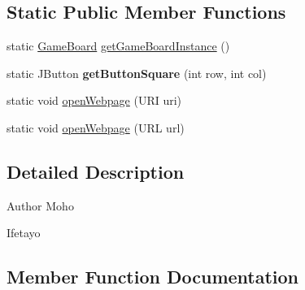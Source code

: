\subsection*{Static Public Member Functions}
\begin{DoxyCompactItemize}
\item 
static \hyperlink{classswantech_1_1_game_board}{Game\+Board} \hyperlink{classswantech_1_1_game_board_adf68d07f448466b7cea27014ba5f40b4}{get\+Game\+Board\+Instance} ()
\item 
\hypertarget{classswantech_1_1_game_board_a680b7fcb3fffd63e95e7242e71ae079f}{}static J\+Button {\bfseries get\+Button\+Square} (int row, int col)\label{classswantech_1_1_game_board_a680b7fcb3fffd63e95e7242e71ae079f}

\item 
static void \hyperlink{classswantech_1_1_game_board_a86a18309ffd7a1b540e3e8eab150af32}{open\+Webpage} (U\+R\+I uri)
\item 
static void \hyperlink{classswantech_1_1_game_board_a656929f09c792703d23ec4d3d13d3d03}{open\+Webpage} (U\+R\+L url)
\end{DoxyCompactItemize}


\subsection{Detailed Description}
\begin{DoxyAuthor}{Author}
Moho 

Ifetayo 
\end{DoxyAuthor}


\subsection{Member Function Documentation}
\hypertarget{classswantech_1_1_game_board_a37481f0e2444ee2e092edc3e714382bc}{}

